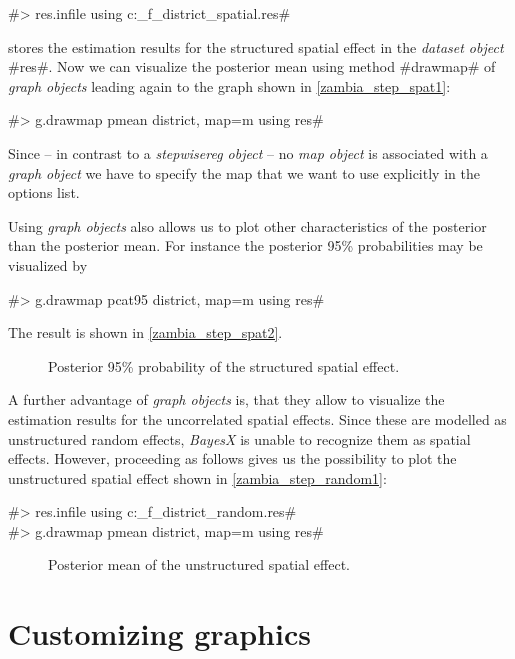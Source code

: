 \documentclass[11pt,a4paper,twoside]{bayesxreport}
\begin{document}
#> res.infile using c:\data\s_f_district_spatial.res#

stores the estimation results for the structured spatial effect in
the {\em dataset object} #res#. Now we can visualize the posterior
mean using method #drawmap# of {\it graph objects} leading again to
the graph shown in \autoref{zambia_step_spat1}:

#> g.drawmap pmean district, map=m using res#

Since -- in contrast to a {\it stepwisereg object} -- no {\it map
object} is associated with a {\it graph object} we have to specify
the map that we want to use explicitly in the options list.

Using {\it graph objects} also allows us to plot other
characteristics of the posterior than the posterior mean. For
instance the posterior 95\% probabilities may be visualized by

#> g.drawmap pcat95 district, map=m using res#

The result is shown in \autoref{zambia_step_spat2}.

\begin{figure}[ht]
\begin{center}
{\it\caption{Posterior 95\% probability of the structured spatial
effect.\label{zambia_step_spat2}}}
\end{center}
\end{figure}

A further advantage of {\it graph objects} is, that they allow to
visualize the estimation results for the uncorrelated spatial
effects. Since these are modelled as unstructured random effects,
{\it BayesX} is unable to recognize them as spatial effects.
However, proceeding as follows gives us the possibility to plot the
unstructured spatial effect shown in \autoref{zambia_step_random1}:

#> res.infile using c:\data\s_f_district_random.res#\\
#> g.drawmap pmean district, map=m using res#

\begin{figure}[ht]
\begin{center}
{\it\caption{Posterior mean of the unstructured spatial
effect.\label{zambia_step_random1}}}
\end{center}
\end{figure}

\section{Customizing graphics}\label{zambia_step_custom}
\end{document}
